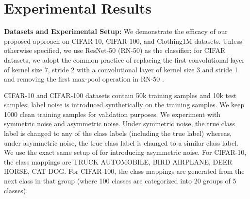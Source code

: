 \documentclass[final]{cvpr}
\begin{document}
\begin{table}[t]\centering
    \caption{Test accuracy (\%) for various methods on  Clothing1M. We use results for the ImageNet initializer from their respective papers. 
    }
    \label{tab:clothing}
    \vspace{-0.4cm}
\end{table}

\vspace{-0.1cm}
\section{Experimental Results}
\vspace{-0.1cm}


{\bf Datasets and Experimental Setup:} We demonstrate the efficacy of our proposed approach on CIFAR-10, CIFAR-100, and Clothing1M datasets. Unless otherwise specified, we use ResNet-50 (RN-50) as the classifier; for CIFAR datasets, we adopt the common practice of replacing the first convolutional layer of kernel size 7, stride 2 with a convolutional layer of kernel size 3 and stride 1 and removing the first max-pool operation in RN-50 \cite{simclr}. 

CIFAR-10 and CIFAR-100 datasets contain 50k training samples and 10k test samples; label noise is introduced synthetically on the training samples. We keep 1000 clean training samples for validation purposes. We experiment with symmetric noise and asymmetric noise. Under symmetric noise, the true class label is changed to any of the class labels (including the true label) whereas, under asymmetric noise, the true class label is changed to a similar class label. We use the exact same setup of \cite{generalized-ce,forward} for introducing asymmetric noise. For CIFAR-10, the class mappings are TRUCK  AUTOMOBILE, BIRD  AIRPLANE, DEER  HORSE, CAT  DOG. For CIFAR-100, the class mappings are generated from the next class in that group (where 100 classes are categorized into 20 groups of 5 classes). 
\end{document}
